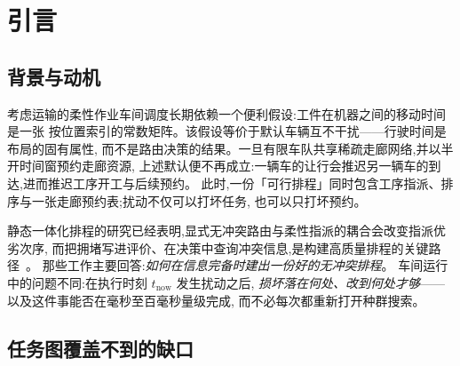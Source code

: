 \documentclass[manuscript,screen,review]{acmart}
\begin{document}


\maketitle

\section{引言}
\label{sec:introduction}

\subsection{背景与动机}

考虑运输的柔性作业车间调度长期依赖一个便利假设:工件在机器之间的移动时间是一张
按位置索引的常数矩阵。该假设等价于默认车辆互不干扰——行驶时间是布局的固有属性,
而不是路由决策的结果。一旦有限车队共享稀疏走廊网络,并以半开时间窗预约走廊资源,
上述默认便不再成立:一辆车的让行会推迟另一辆车的到达,进而推迟工序开工与后续预约。
此时,一份「可行排程」同时包含工序指派、排序与一张走廊预约表;扰动不仅可以打坏任务,
也可以只打坏预约。

静态一体化排程的研究已经表明,显式无冲突路由与柔性指派的耦合会改变指派优劣次序,
而把拥堵写进评价、在决策中查询冲突信息,是构建高质量排程的关键路径~\cite{vanos2026exact,li2026framework,sun2023integrated}。
那些工作主要回答:\emph{如何在信息完备时建出一份好的无冲突排程}。
车间运行中的问题不同:在执行时刻 \(t_{\mathrm{now}}\) 发生扰动之后,
\emph{损坏落在何处、改到何处才够}——以及这件事能否在毫秒至百毫秒量级完成,
而不必每次都重新打开种群搜索。

\subsection{任务图覆盖不到的缺口}
\end{document}
